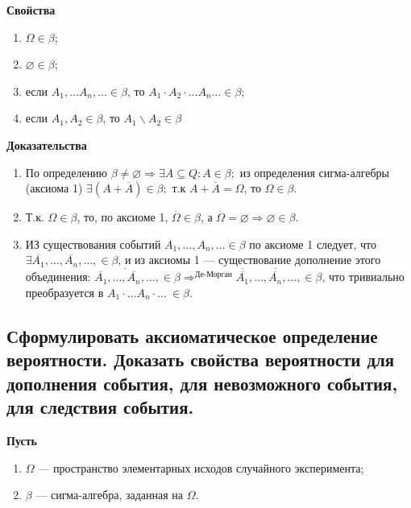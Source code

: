 \textbf{Свойства}

\begin{enumerate}
	
	\item $\Omega \in \beta$;
	\item $\varnothing \in \beta$;
	\item если $A_1, \dots A_n, \dots \in \beta$, то $A_1 \cdot A_2 \cdot \dots A_n \dots \in \beta$;
	\item если $A_1, A_2 \in \beta$, то $A_1 \backslash A_2 \in \beta$
\end{enumerate}


\textbf{Доказательства}

\begin{enumerate}
	\item По определению $\beta \neq \varnothing \Rightarrow \exists A \subseteq Q: A \in \beta;$ из определения сигма-алгебры (аксиома 1) $\exists (A + \overline{A}) \in \beta;$ т.к $A + \overline{A} = \Omega$, то $\Omega \in \beta$.
	\item Т.к. $\Omega \in \beta$, то, по аксиоме 1, $\overline{\Omega} \in \beta$, а $\overline{\Omega} = \varnothing \Rightarrow \varnothing \in \beta$. 
	\item ИЗ существования событий $A_1, \dots, A_n, \dots \in \beta$ по аксиоме 1 следует, что $\exists \overline{A_1}, \dots, \overline{A_n}, \dots, \in \beta$, и из аксиомы 1 --- существование дополнение этого объединения: $\overline{\overline{A_1}, \dots, \overline{A_n}, \dots}, \in \beta \Rightarrow^{\text{Де-Морган}} \overline{\overline{A_1}}, \dots, \overline{\overline{A_n}}, \dots, \in \beta$, что тривиально преобразуется в $A_1 \cdot \dots  A_n \cdot \dots\  \in \beta$.
\end{enumerate}


\subsection{Сформулировать аксиоматическое определение вероятности. Доказать свойства вероятности для дополнения события, для невозможного события, для следствия события.}


\textbf{Пусть} 

\begin{enumerate}
	\item $\Omega$ --- пространство элементарных исходов случайного эксперимента;
	\item $\beta$ --- сигма-алгебра, заданная на $\Omega$.
\end{enumerate}

